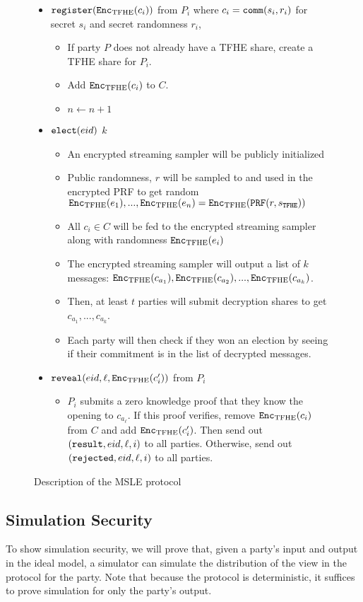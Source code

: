\begin{figure}
{\begin{minipage}{1\textwidth}
\begin{itemize}
				\item $\texttt{register}(\texttt{Enc}_{\mathrm{TFHE}}(c_i))$ from $P_i$ where $c_i = \texttt{comm}(s_i, r_i)$ for secret $s_i$ and secret randomness $r_i$,
				\begin{itemize}
					\item If party $P$ does not already have a TFHE share, create a TFHE share for $P_i$.
					\item Add $\texttt{Enc}_{\mathrm{TFHE}}(c_i)$ to $C$.
					\item $n \gets n + 1$
				\end{itemize}
				\item $\texttt{elect}({eid})$ $k$  
					\begin{itemize}
						\item An encrypted streaming sampler will be publicly initialized
						\item Public randomness, $r$ will be sampled to and used in the encrypted PRF to get random $\texttt{Enc}_{\mathrm{TFHE}}(e_1), ..., \texttt{Enc}_{\mathrm{TFHE}}(e_n)= \texttt{Enc}_{\mathrm{TFHE}}(\texttt{PRF}(r, s_\texttt{TFHE}))$
						\item All $c_i \in C$ will be fed to the encrypted streaming sampler along with randomness $\texttt{Enc}_{\mathrm{TFHE}}(e_i)$ 
						\item The encrypted streaming sampler will output a list of $k$ messages: $\texttt{Enc}_{\mathrm{TFHE}}(c_{a_1}), \texttt{Enc}_{\mathrm{TFHE}}(c_{a_2}), ..., \texttt{Enc}_{\mathrm{TFHE}}(c_{a_k})$.
						\item Then, at least $t$ parties will submit decryption shares to get $c_{a_1}, ..., c_{a_k}$.
						\item Each party will then check if they won an election by seeing if their commitment is in the list of decrypted messages.
					\end{itemize}
				\item $\texttt{reveal}({eid}, \ell, \texttt{Enc}_{\mathrm{TFHE}}(c'_i))$ from $P_i$
					\begin{itemize}
						\item $P_i$ submits a zero knowledge proof that they know the opening to $c_{a_\ell}$. If this proof verifies,
						remove $\texttt{Enc}_{\mathrm{TFHE}}(c_i)$ from $C$ and add $\texttt{Enc}_{\mathrm{TFHE}}(c'_i)$. Then send out $(\texttt{result}, {eid}, \ell, i)$ to all parties.
						Otherwise, send out $(\texttt{rejected}, {eid}, \ell, i)$ to all parties.
					\end{itemize}
			\end{itemize}
		\end{minipage}
	}
	\caption{Description of the MSLE protocol}
	\label{fig:protocolMSLE}
\end{figure}

\subsection{Simulation Security}
To show simulation security, we will prove that, given a party's input and output in the ideal model,
a simulator can simulate the distribution of the view in the protocol for the party. Note that because the
protocol is deterministic, it suffices to prove simulation for only the party's output.

